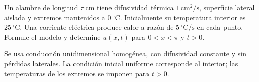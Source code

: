 Un alambre de longitud $\pi\,\mathrm{cm}$ tiene difusividad térmica $1\,\mathrm{cm^2/s}$, superficie lateral aislada y extremos mantenidos a $0\,{}^\circ\mathrm C$. Inicialmente su temperatura interior es $25\,{}^\circ\mathrm C$. Una corriente eléctrica produce calor a razón de $5\,{}^\circ\mathrm C/\mathrm s$ en cada punto. Formule el modelo y determine $u(x,t)$ para $0<x<\pi$ y $t>0$.

Se usa conducción unidimensional homogénea, con difusividad constante y sin pérdidas laterales. La condición inicial uniforme corresponde al interior; las temperaturas de los extremos se imponen para $t>0$.
